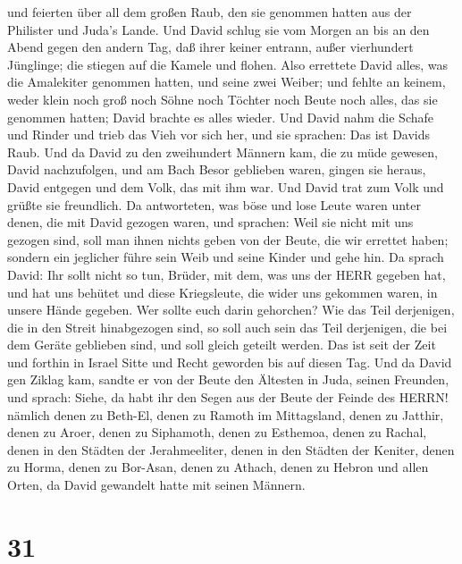 und feierten über all dem großen Raub, den sie genommen hatten aus der
Philister und Juda's Lande.  Und David schlug sie vom
Morgen an bis an den Abend gegen den andern Tag, daß ihrer keiner
entrann, außer vierhundert Jünglinge; die stiegen auf die Kamele und
flohen.  Also errettete David alles, was die Amalekiter
genommen hatten, und seine zwei Weiber;  und fehlte an
keinem, weder klein noch groß noch Söhne noch Töchter noch Beute noch
alles, das sie genommen hatten; David brachte es alles wieder.
 Und David nahm die Schafe und Rinder und trieb das Vieh
vor sich her, und sie sprachen: Das ist Davids Raub.  Und
da David zu den zweihundert Männern kam, die zu müde gewesen, David
nachzufolgen, und am Bach Besor geblieben waren, gingen sie heraus,
David entgegen und dem Volk, das mit ihm war. Und David trat zum Volk
und grüßte sie freundlich.  Da antworteten, was böse und
lose Leute waren unter denen, die mit David gezogen waren, und sprachen:
Weil sie nicht mit uns gezogen sind, soll man ihnen nichts geben von der
Beute, die wir errettet haben; sondern ein jeglicher führe sein Weib und
seine Kinder und gehe hin.  Da sprach David: Ihr sollt
nicht so tun, Brüder, mit dem, was uns der HERR gegeben hat, und hat uns
behütet und diese Kriegsleute, die wider uns gekommen waren, in unsere
Hände gegeben.  Wer sollte euch darin gehorchen? Wie das
Teil derjenigen, die in den Streit hinabgezogen sind, so soll auch sein
das Teil derjenigen, die bei dem Geräte geblieben sind, und soll gleich
geteilt werden.  Das ist seit der Zeit und forthin in
Israel Sitte und Recht geworden bis auf diesen Tag.  Und da
David gen Ziklag kam, sandte er von der Beute den Ältesten in Juda,
seinen Freunden, und sprach: Siehe, da habt ihr den Segen aus der Beute
der Feinde des HERRN!  nämlich denen zu Beth-El, denen zu
Ramoth im Mittagsland, denen zu Jatthir,  denen zu Aroer,
denen zu Siphamoth, denen zu Esthemoa,  denen zu Rachal,
denen in den Städten der Jerahmeeliter, denen in den Städten der
Keniter,  denen zu Horma, denen zu Bor-Asan, denen zu
Athach,  denen zu Hebron und allen Orten, da David
gewandelt hatte mit seinen Männern.

\hypertarget{section-30}{%
\section{31}\label{section-30}}


